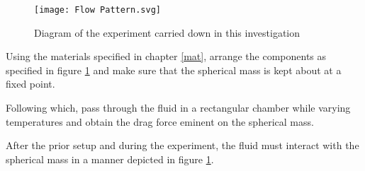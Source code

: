 \begin{figure}[H]
    \centering
    \texttt{[image: Flow Pattern.svg]}
	\caption{{Diagram of the experiment carried down in this investigation}}
    \label{exp1}
\end{figure}


{Using the materials specified in chapter \ref{mat}, arrange the components as specified in figure \ref{exp1} and make sure that the spherical mass is kept about at a fixed point.}

{Following which, pass through the fluid in a rectangular chamber while varying temperatures and obtain the drag force eminent on the spherical mass.}

{After the prior setup and during the experiment, the fluid must interact with the spherical mass in a manner depicted in figure \ref{exp1}.}

